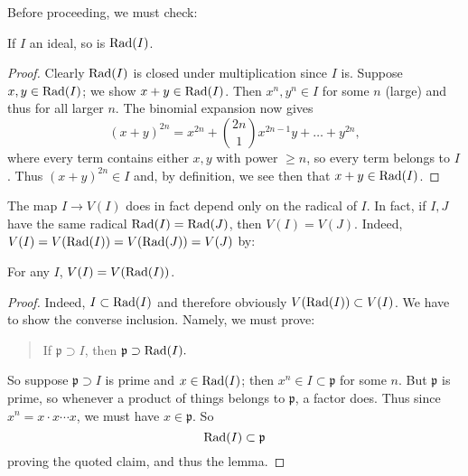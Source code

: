 Before proceeding, we must check:
\begin{lemma} 
If $I$ an ideal, so is $\operatorname{Rad}(I)$.
\end{lemma} 
\begin{proof} 
Clearly $\operatorname{Rad}(I)$ is closed under multiplication since $I$ is.
Suppose $x,y \in \operatorname{Rad}(I)$; we show $x+y \in \operatorname{Rad}(I)$. Then $x^n,
y^n \in I$
for some $n$ (large) and thus for all larger $n$. The binomial
expansion now
gives
\[ (x+y)^{2n} = x^{2n} + \binom{2n}{1} x^{2n-1}y + \dots +
y^{2n}, \]
where every term contains either $x,y$ with power $ \geq n$, so
every term
belongs to $I$. Thus $(x+y)^{2n} \in I$ and, by definition, we
see then that $x+y \in \operatorname{Rad}(I)$.
\end{proof} 

The map $I \to V(I)$ does in fact depend only on the radical of
$I$. In fact, if $I,J$ have the same radical $\operatorname{Rad}(I) =
\operatorname{Rad}(J)$, then $V(I) = V(J)$.
Indeed, $V(I) = V(\operatorname{Rad}(I)) = V(\operatorname{Rad}(J)) = V(J)$ by:
\begin{lemma} 
For any $I$, $V(I) = V(\operatorname{Rad}(I))$.
\end{lemma} 
\begin{proof} 
Indeed, $I \subset \operatorname{Rad}(I)$ and therefore obviously $V(\operatorname{Rad}(I))
\subset V(I)$. We have to show the
converse inclusion. Namely, we must prove:
\begin{quote}
If $\mathfrak{p} \supset I$, then $\mathfrak{p} \supset
\operatorname{Rad}(I).$
\end{quote}
So suppose $\mathfrak{p} \supset I$ is prime and $x \in
\operatorname{Rad}(I)$; then $x^n \in I \subset \mathfrak{p}$ for some $n$.
But $\mathfrak{p}$ is prime, so whenever a product of things
belongs to
$\mathfrak{p}$, a factor does. Thus since $x^n = x \cdot x
\cdots x$, we must
have $x \in \mathfrak{p}$. So
\[ \operatorname{Rad}(I) \subset \mathfrak{p}  \]
proving the quoted claim, and thus the lemma.
\end{proof} 

